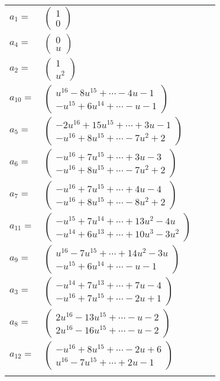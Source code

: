 \documentclass[1p]{elsarticle_modified}
\theoremstyle{definition}
\begin{document}
\begin{tabular}{m{7pt} m{180pt} m{7pt} m{180pt} }
\flushright $a_{1}=$&$\begin{pmatrix}1\\0\end{pmatrix}$ \\
\flushright $a_{4}=$&$\begin{pmatrix}0\\u\end{pmatrix}$ \\
\flushright $a_{2}=$&$\begin{pmatrix}1\\u^2\end{pmatrix}$ \\
\flushright $a_{10}=$&$\begin{pmatrix}u^{16}-8 u^{15}+\cdots-4 u-1\\- u^{15}+6 u^{14}+\cdots- u-1\end{pmatrix}$ \\
\flushright $a_{5}=$&$\begin{pmatrix}-2 u^{16}+15 u^{15}+\cdots+3 u-1\\- u^{16}+8 u^{15}+\cdots-7 u^2+2\end{pmatrix}$ \\
\flushright $a_{6}=$&$\begin{pmatrix}- u^{16}+7 u^{15}+\cdots+3 u-3\\- u^{16}+8 u^{15}+\cdots-7 u^2+2\end{pmatrix}$ \\
\flushright $a_{7}=$&$\begin{pmatrix}- u^{16}+7 u^{15}+\cdots+4 u-4\\- u^{16}+8 u^{15}+\cdots-8 u^2+2\end{pmatrix}$ \\
\flushright $a_{11}=$&$\begin{pmatrix}- u^{15}+7 u^{14}+\cdots+13 u^2-4 u\\- u^{14}+6 u^{13}+\cdots+10 u^3-3 u^2\end{pmatrix}$ \\
\flushright $a_{9}=$&$\begin{pmatrix}u^{16}-7 u^{15}+\cdots+14 u^2-3 u\\- u^{15}+6 u^{14}+\cdots- u-1\end{pmatrix}$ \\
\flushright $a_{3}=$&$\begin{pmatrix}- u^{14}+7 u^{13}+\cdots+7 u-4\\- u^{16}+7 u^{15}+\cdots-2 u+1\end{pmatrix}$ \\
\flushright $a_{8}=$&$\begin{pmatrix}2 u^{16}-13 u^{15}+\cdots- u-2\\2 u^{16}-16 u^{15}+\cdots- u-2\end{pmatrix}$ \\
\flushright $a_{12}=$&$\begin{pmatrix}- u^{16}+8 u^{15}+\cdots-2 u+6\\u^{16}-7 u^{15}+\cdots+2 u-1\end{pmatrix}$\\&\end{tabular}
\end{document}
